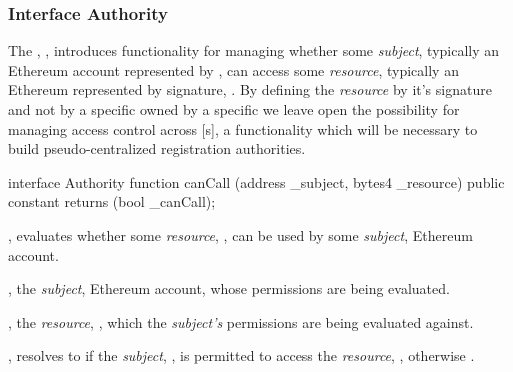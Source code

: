 \subsubsection{Interface Authority}

The , , introduces functionality for
managing whether some \emph{subject}, typically an Ethereum account represented
by , can access some \emph{resource}, typically an Ethereum
 represented by  signature, . By
defining the \emph{resource} by it's  signature and not by a
specific  owned by a specific  we leave open the
possibility for managing  access control across
[s], a functionality which will be necessary to build
pseudo-centralized registration authorities.

\begin{solidity}
interface Authority {
  function canCall (address _subject, bytes4 _resource) public constant returns (bool _canCall);
}
\end{solidity}

\begin{interface}
  \begin{functions}
    \item {}, evaluates
      whether some \emph{resource}, , can be used by
      some \emph{subject}, Ethereum account.

      \begin{parameters}
        \item {}, the \emph{subject}, Ethereum account,
          whose permissions are being evaluated.\footnotemark{}


        \item {}, the \emph{resource}, , which the \emph{subject's} permissions are being evaluated
          against.
      \end{parameters}

      \begin{returns}
        \item {}, resolves to  if the
          \emph{subject}, , is permitted to access the
          \emph{resource}, , otherwise .
      \end{returns}
  \end{functions}
\end{interface}
